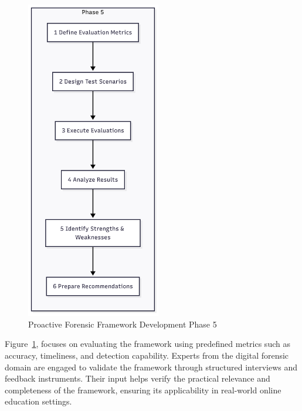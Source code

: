\begin{figure}[H]
    \centering
    \includegraphics[height=14cm]{figure/framework-development-phase-5.png}
    \caption{Proactive Forensic Framework Development Phase 5}
    \label{fig:framework-development-phase-5}
\end{figure}

Figure~\ref{fig:framework-development-phase-5}, focuses on evaluating the framework using predefined metrics such as accuracy, timeliness, and detection capability. Experts from the digital forensic domain are engaged to validate the framework through structured interviews and feedback instruments. Their input helps verify the practical relevance and completeness of the framework, ensuring its applicability in real-world online education settings.


